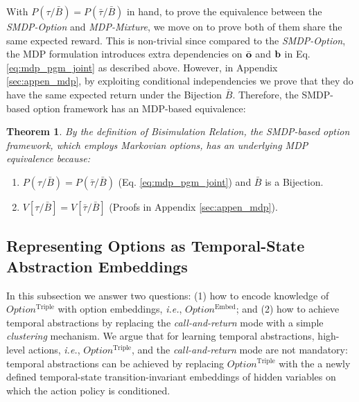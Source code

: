 \documentclass[10pt,journal,compsoc]{IEEEtran}
\newtheorem{thm}{Theorem}[section]
\begin{document}
With $P(\tau/\bar{B}) = P(\bar{\tau}/\bar{B})$ in hand, to prove the
equivalence between the \emph{SMDP-Option} and \emph{MDP-Mixture}, we move on to
prove both of them share the same expected reward. This is
non-trivial since compared to the \emph{SMDP-Option}, the MDP
formulation introduces extra dependencies on $\bar{{\mathbf{o}}}$ and
${\mathbf{b}}$ in Eq.\ref{eq:mdp_pgm_joint} as described above. However,
in Appendix \ref{sec:appen_mdp}, by exploiting conditional
independencies we prove that they do have the same expected
return under the Bijection $\bar{B}$. Therefore, the SMDP-based
option framework has an MDP-based equivalence:
\begin{thm}
  \label{theo:smdp_mdp}
  By the definition of Bisimulation Relation, the SMDP-based
  option framework, which employs Markovian options, has an
  underlying MDP equivalence because:
\end{thm}
\begin{enumerate}
\item
  $P(\tau/\bar{B})
  = P(\bar{\tau}/\bar{B})$
  (Eq. \ref{eq:mdp_pgm_joint}) and $\bar{B}$ is a Bijection.\\
\item
  $V[\tau/\bar{B}]=V[\bar{\tau}/\bar{B}]$
  (Proofs in Appendix \ref{sec:appen_mdp}).
\end{enumerate}

\subsection{Representing Options as Temporal-State Abstraction
  Embeddings}
\label{sec:option_embed}
In this subsection we answer two questions: (1) how to encode
knowledge of $Option^{\textrm{Triple}}$ with option embeddings, \textit{i.e.}, $Option^{\textrm{Embed}}$; and (2) how to achieve
temporal abstractions by replacing the \emph{call-and-return} mode
with a simple \emph{clustering} mechanism. We argue that for
learning temporal abstractions, high-level actions, \textit{i.e.},
$Option^{\textrm{Triple}}$, and the \emph{call-and-return} mode are not
mandatory: temporal abstractions can be achieved by replacing
$Option^{\textrm{Triple}}$ with the a newly defined temporal-state transition-invariant embeddings of hidden variables on which the action policy is conditioned.
\end{document}
